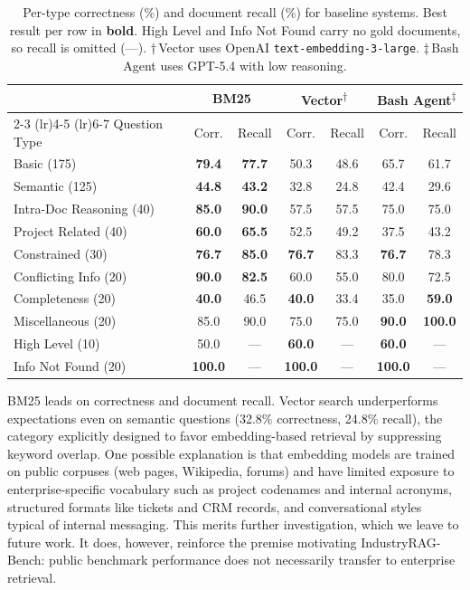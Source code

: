 \documentclass{article}
\begin{document}
\begin{table}[t]
  \caption{Per-type correctness (\%) and document recall (\%) for baseline systems. Best result per row in \textbf{bold}. High Level and Info Not Found carry no gold documents, so recall is omitted (---). $\dagger$\,Vector uses OpenAI \texttt{text-embedding-3-large}. $\ddagger$\,Bash Agent uses GPT-5.4 with low reasoning.}
  \label{tab:pertype_results}
  \centering
  \small
  \begin{tabular}{l cc cc cc}
    \toprule
    & \multicolumn{2}{c}{BM25} & \multicolumn{2}{c}{Vector{\small\textsuperscript{$\dagger$}}} & \multicolumn{2}{c}{Bash Agent{\small\textsuperscript{$\ddagger$}}} \\
    \cmidrule(lr){2-3} \cmidrule(lr){4-5} \cmidrule(lr){6-7}
    Question Type & Corr. & Recall & Corr. & Recall & Corr. & Recall \\
    \midrule
    Basic (175)              & \textbf{79.4} & \textbf{77.7} & 50.3 & 48.6 & 65.7 & 61.7 \\
    Semantic (125)           & \textbf{44.8} & \textbf{43.2} & 32.8 & 24.8 & 42.4 & 29.6 \\
    Intra-Doc Reasoning (40) & \textbf{85.0} & \textbf{90.0} & 57.5 & 57.5 & 75.0 & 75.0 \\
    Project Related (40)     & \textbf{60.0} & \textbf{65.5} & 52.5 & 49.2 & 37.5 & 43.2 \\
    Constrained (30)         & \textbf{76.7} & \textbf{85.0} & \textbf{76.7} & 83.3 & \textbf{76.7} & 78.3 \\
    Conflicting Info (20)    & \textbf{90.0} & \textbf{82.5} & 60.0 & 55.0 & 80.0 & 72.5 \\
    Completeness (20)        & \textbf{40.0} & 46.5          & \textbf{40.0} & 33.4 & 35.0 & \textbf{59.0} \\
    Miscellaneous (20)       & 85.0          & 90.0          & 75.0 & 75.0 & \textbf{90.0} & \textbf{100.0} \\
    High Level (10)          & 50.0          & ---           & \textbf{60.0} & --- & \textbf{60.0} & --- \\
    Info Not Found (20)      & \textbf{100.0}& ---           & \textbf{100.0}& --- & \textbf{100.0}& --- \\
    \bottomrule
  \end{tabular}
\end{table}

BM25 leads on correctness and document recall. Vector search underperforms expectations even on semantic questions (32.8\% correctness, 24.8\% recall), the category explicitly designed to favor embedding-based retrieval by suppressing keyword overlap. One possible explanation is that embedding models are trained on public corpuses (web pages, Wikipedia, forums) and have limited exposure to enterprise-specific vocabulary such as project codenames and internal acronyms, structured formats like tickets and CRM records, and conversational styles typical of internal messaging. This merits further investigation, which we leave to future work. It does, however, reinforce the premise motivating IndustryRAG-Bench: public benchmark performance does not necessarily transfer to enterprise retrieval.
\end{document}
